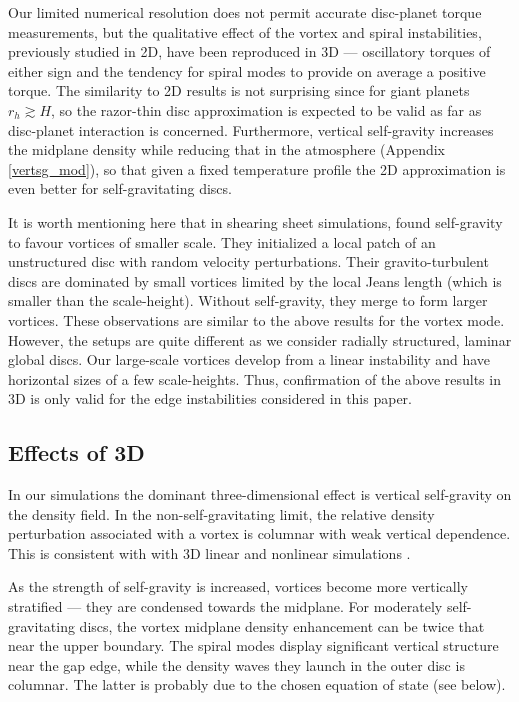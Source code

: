 Our limited numerical resolution does not permit accurate disc-planet
torque measurements, but 
the qualitative effect of the vortex and spiral instabilities,
previously studied in 2D, have been reproduced in 3D --- oscillatory
torques of either sign and the tendency for spiral modes to provide on
average a positive torque. 
The similarity to 2D results is not surprising since for  
giant planets $r_h\gtrsim H$, so the razor-thin disc approximation is
expected to be valid as far as disc-planet interaction is
concerned. Furthermore, vertical self-gravity increases the midplane
density while reducing that in the atmosphere (Appendix
\ref{vertsg_mod}), so that given a fixed temperature profile the 2D
approximation is even better for self-gravitating discs. 





 It is worth mentioning here that in shearing sheet
  simulations,  \cite{mamatsashvili09} found 
  self-gravity to favour vortices of smaller scale. They initialized
  a local patch of an unstructured disc with random velocity perturbations.
  Their gravito-turbulent discs are dominated by small vortices limited by
  the local Jeans length (which is smaller than the scale-height). Without self-gravity, 
  they merge to form larger vortices. 
  These observations are similar to the above results for the vortex mode.  
  However, the setups are quite different 
  as we consider radially structured, laminar global discs. Our
  large-scale vortices develop from a linear instability and have horizontal sizes
  of a few scale-heights. Thus, confirmation of the above results in 3D is only valid
  for the edge instabilities considered in this paper.   




\subsection{Effects of 3D}
In our simulations the dominant three-dimensional effect is
vertical self-gravity on the density field. In the
non-self-gravitating limit, the relative density perturbation
associated with a vortex is columnar with weak vertical dependence. This is
consistent with with 3D linear and nonlinear simulations
\citep{meheut10, meheut12a,  meheut12b, lin12}.       

As the strength of self-gravity is increased, vortices become 
more vertically stratified --- they are condensed towards the
midplane. For moderately self-gravitating discs, the vortex
midplane density enhancement can be twice that near the upper
boundary.  The spiral modes display significant vertical structure
near the gap edge, while the density waves they launch in the outer
disc is columnar.  The latter is probably due to the chosen equation of state (see below).


